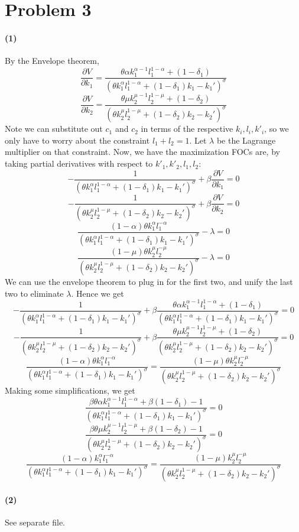 \documentclass[10pt,letter]{article}
\newcommand{\problem}[1]{\section*{Problem #1}}
\newcommand{\problempart}[1]{\paragraph{#1}}
\begin{document}
\problem{3}
\problempart{(1)}
By the Envelope theorem,
\[ \frac{\partial V}{\partial k_1} = \frac{\theta \alpha k_1^{\alpha-1}l_1^{1-\alpha} + (1-\delta_1)}{(\theta k_1^\alpha l_1^{1-\alpha} + (1-\delta_1)k_1 - k_1')^\sigma} \]
\[ \frac{\partial V}{\partial k_2} = \frac{\theta \mu k_2^{\mu-1}l_2^{1-\mu} + (1-\delta_2)}{(\theta k_2^\mu l_2^{1-\mu} + (1-\delta_2)k_2 - k_2')^\sigma} \]
Note we can substitute out $c_1$ and $c_2$ in terms of the respective $k_i, l_i, k'_i$, so we only have to worry about the constraint $l_1 + l_2 = 1$. Let $\lambda$ be the Lagrange multiplier on that constraint. Now, we have the maximization FOCs are, by taking partial derivatives with respect to $k'_1, k'_2, l_1, l_2$:
\[ - \frac{1}{(\theta k_1^\alpha l_1^{1-\alpha} + (1-\delta_1)k_1 - k_1')^\sigma} + \beta \frac{\partial V}{\partial k_1} = 0 \]
\[ - \frac{1}{(\theta k_2^\mu l_2^{1-\mu} + (1-\delta_2)k_2 - k_2')^\sigma} + \beta \frac{\partial V}{\partial k_2} = 0 \]
\[ \frac{(1-\alpha)\theta k_1^\alpha l_1^{-\alpha}}{(\theta k_1^\alpha l_1^{1-\alpha} + (1-\delta_1)k_1 - k_1')^\sigma}  - \lambda = 0 \]
\[  \frac{(1-\mu)\theta k_2^\mu l_2^{-\mu}}{(\theta k_2^\mu l_2^{1-\mu} + (1-\delta_2)k_2 - k_2')^\sigma} - \lambda = 0 \]
We can use the envelope theorem to plug in for the first two, and unify the last two to eliminate $\lambda$. Hence we get
\[ - \frac{1}{(\theta k_1^\alpha l_1^{1-\alpha} + (1-\delta_1)k_1 - k_1')^\sigma} + \beta \frac{\theta \alpha k_1^{\alpha-1}l_1^{1-\alpha} + (1-\delta_1)}{(\theta k_1^\alpha l_1^{1-\alpha} + (1-\delta_1)k_1 - k_1')^\sigma} = 0 \]
\[ - \frac{1}{(\theta k_2^\mu l_2^{1-\mu} + (1-\delta_2)k_2 - k_2')^\sigma} + \beta \frac{\theta \mu k_2^{\mu-1}l_2^{1-\mu} + (1-\delta_2)}{(\theta k_2^\mu l_2^{1-\mu} + (1-\delta_2)k_2 - k_2')^\sigma} = 0 \]
\[ \frac{(1-\alpha)\theta k_1^\alpha l_1^{-\alpha}}{(\theta k_1^\alpha l_1^{1-\alpha} + (1-\delta_1)k_1 - k_1')^\sigma} = \frac{(1-\mu)\theta k_2^\mu l_2^{-\mu}}{(\theta k_2^\mu l_2^{1-\mu} + (1-\delta_2)k_2 - k_2')^\sigma} \]
Making some simplifications, we get
\[ \frac{\beta \theta \alpha k_1^{\alpha-1}l_1^{1-\alpha} + \beta (1-\delta_1) - 1}{(\theta k_1^\alpha l_1^{1-\alpha} + (1-\delta_1)k_1 - k_1')^\sigma} = 0 \]
\[ \frac{\beta \theta \mu k_2^{\mu-1}l_2^{1-\mu} + \beta (1-\delta_2) - 1}{(\theta k_2^\mu l_2^{1-\mu} + (1-\delta_2)k_2 - k_2')^\sigma} = 0 \]
\[ \frac{(1-\alpha) k_1^\alpha l_1^{-\alpha}}{(\theta k_1^\alpha l_1^{1-\alpha} + (1-\delta_1)k_1 - k_1')^\sigma} = \frac{(1-\mu) k_2^\mu l_2^{-\mu}}{(\theta k_2^\mu l_2^{1-\mu} + (1-\delta_2)k_2 - k_2')^\sigma} \]
\problempart{(2)} See separate file.
\end{document}
